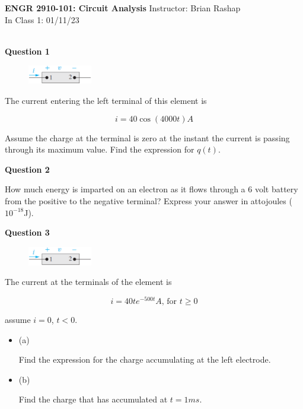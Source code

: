\documentclass[12pt]{article}
\newcommand{\bit}{\begin{itemize}}
\newcommand{\eit}{\end{itemize}}
\begin{document}

\begin{center}
\hfil
{\large\bf {ENGR 2910-101: Circuit Analysis}}
\hfill Instructor: Brian Rashap\\
In Class 1: 01/11/23 \\
\hrulefill\\
\end{center}




\noindent
{\bf Question 1} %

\begin{figure}[h!]
  \centering 
  \includegraphics[clip,width=0.25\textwidth]{Fig1-5.eps}
\end{figure}

\noindent
The current entering the left terminal of this element is

\[
i = 40 \cos{(4000 t)} A
\]

\noindent
Assume the charge at the terminal is zero at the instant the current is passing through its maximum value. Find the expression for $q(t)$.

\vspace{0.3in}
\noindent
{\bf Question 2} %

\noindent
How much energy is imparted on an electron as it flows through a 6 volt battery from the positive to the negative terminal? Express your answer in attojoules ($10^{-18}$J).



\vspace{0.3in}
\noindent
{\bf Question 3}  %

\begin{figure}[h!]
  \centering 
  \includegraphics[clip,width=0.25\textwidth]{Fig1-5.eps}
\end{figure}

\noindent
The current at the terminals of the element is

\[
i = 40 t e^{-500 t} A \text{, for } t \geq 0 
\]

\noindent
assume $i = 0$, $t < 0$. 

\bit

\item[(a)]

Find the expression for the charge accumulating at the left electrode.

\item[(b)]

Find the charge that has accumulated at $t = 1 ms$.

\eit
\end{document}

